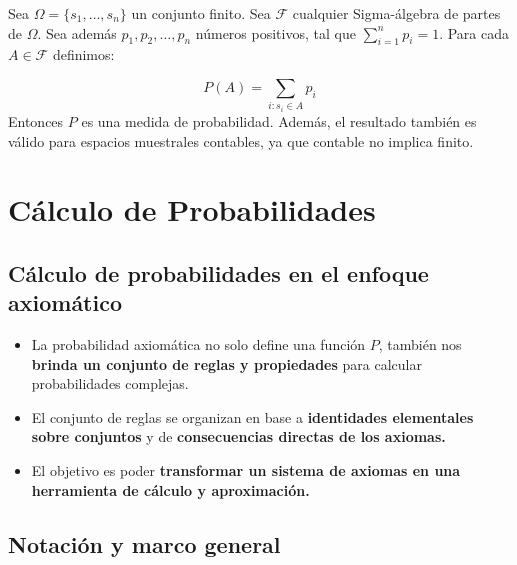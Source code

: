 \documentclass[
  letterpaper,
  DIV=11,
  numbers=noendperiod]{scrreprt}
\providecommand{\tightlist}{%
  \setlength{\itemsep}{0pt}\setlength{\parskip}{0pt}}
\begin{document}
\begin{tcolorbox}[enhanced jigsaw, arc=.35mm, bottomrule=.15mm, bottomtitle=1mm, breakable, colback=white, colbacktitle=quarto-callout-warning-color!10!white, colframe=quarto-callout-warning-color-frame, coltitle=black, left=2mm, leftrule=.75mm, opacityback=0, opacitybacktitle=0.6, rightrule=.15mm, title={Teorema}, titlerule=0mm, toprule=.15mm, toptitle=1mm]

Sea \(\Omega = \{s_1, \ldots,s_n\}\) un conjunto finito. Sea
\(\mathcal{F}\) cualquier Sigma-álgebra de partes de \(\Omega\). Sea
además \(p_1, p_2, \ldots, p_n\) números positivos, tal que
\(\sum_{i=1}^np_i=1\). Para cada \(A \in \mathcal{F}\) definimos:

\[
P(A) = \sum_{i:s_i \in A }p_i
\] Entonces \(P\) es una medida de probabilidad. Además, el resultado
también es válido para espacios muestrales contables, ya que contable no
implica finito.

\end{tcolorbox}


\chapter{Cálculo de Probabilidades}\label{cuxe1lculo-de-probabilidades}

\section{Cálculo de probabilidades en el enfoque
axiomático}\label{cuxe1lculo-de-probabilidades-en-el-enfoque-axiomuxe1tico}

\begin{itemize}
\tightlist
\item
  La probabilidad axiomática no solo define una función \(P\), también
  nos \textbf{brinda un conjunto de reglas y propiedades} para calcular
  probabilidades complejas.
\item
  El conjunto de reglas se organizan en base a \textbf{identidades
  elementales sobre conjuntos} y de \textbf{consecuencias directas de
  los axiomas.}
\item
  El objetivo es poder \textbf{transformar un sistema de axiomas en una
  herramienta de cálculo y aproximación.}
\end{itemize}

\section{Notación y marco general}\label{notaciuxf3n-y-marco-general}
\end{document}
